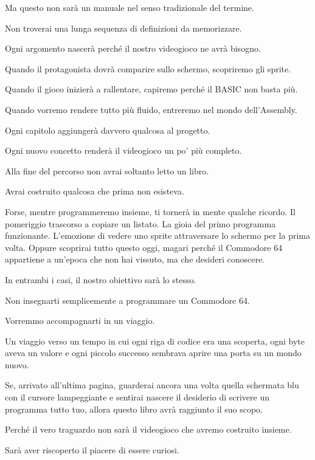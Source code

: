 \documentclass{article}
\begin{document}
Ma questo non sarà un manuale nel senso tradizionale del termine.

Non troverai una lunga sequenza di definizioni da memorizzare.

Ogni argomento nascerà perché il nostro videogioco ne avrà bisogno.

Quando il protagonista dovrà comparire sullo schermo, scopriremo gli sprite.

Quando il gioco inizierà a rallentare, capiremo perché il BASIC non basta più.

Quando vorremo rendere tutto più fluido, entreremo nel mondo dell'Assembly.

Ogni capitolo aggiungerà davvero qualcosa al progetto.

Ogni nuovo concetto renderà il videogioco un po' più completo.

Alla fine del percorso non avrai soltanto letto un libro.

Avrai costruito qualcosa che prima non esisteva.

Forse, mentre programmeremo insieme, ti tornerà in mente qualche ricordo. Il pomeriggio trascorso a copiare un listato.
La gioia del primo programma funzionante. L'emozione di vedere uno sprite attraversare lo schermo per la prima volta.
Oppure scoprirai tutto questo oggi, magari perché il Commodore 64 appartiene a un'epoca che non hai vissuto, ma che
desideri conoscere.

In entrambi i casi, il nostro obiettivo sarà lo stesso.

Non insegnarti semplicemente a programmare un Commodore 64.

Vorremmo accompagnarti in un viaggio.

Un viaggio verso un tempo in cui ogni riga di codice era una scoperta, ogni byte aveva un valore e ogni piccolo successo
sembrava aprire una porta su un mondo nuovo.

Se, arrivato all'ultima pagina, guarderai ancora una volta quella schermata blu con il cursore lampeggiante e sentirai
nascere il desiderio di scrivere un programma tutto tuo, allora questo libro avrà raggiunto il suo scopo.

Perché il vero traguardo non sarà il videogioco che avremo costruito insieme.

Sarà aver riscoperto il piacere di essere curiosi.


\bigskip
\end{document}
